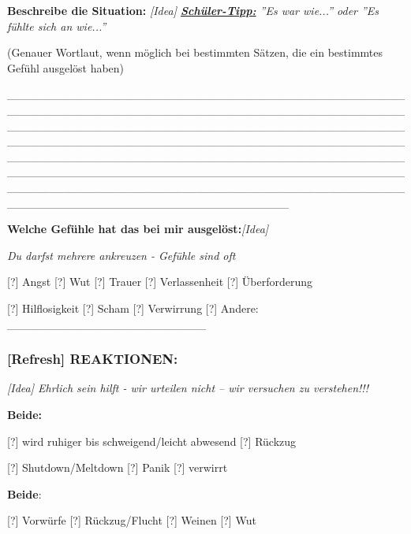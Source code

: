 \textbf{Beschreibe die Situation:} \emph{[Idea] \textbf{\ul{Schüler-Tipp:}} ''Es war wie...'' oder ''Es fühlte sich an wie...''}

(Genauer Wortlaut, wenn möglich bei bestimmten Sätzen, die ein bestimmtes Gefühl ausgelöst haben)

\_\_\_\_\_\_\_\_\_\_\_\_\_\_\_\_\_\_\_\_\_\_\_\_\_\_\_\_\_\_\_\_\_\_\_\_\_\_\_\_\_\_\_\_\_\_\_\_\_\_\_\_\_\_\_\_\_\_\_\_\_\_\_\_\_\_\_\_\_\_\_\_\_\_\_\_\_\_\_\_\_\_\_\_\_\_\_\_\_\_\_\_\_\_\_\_\_\_\_\_\_\_\_\_\_\_\_\_\_\_\_\_\_\_\_\_\_\_\_\_\_\_\_\_\_\_\_\_\_\_\_\_\_\_\_\_\_\_\_\_\_\_\_\_\_\_\_\_\_\_\_\_\_\_\_\_\_\_\_\_\_\_\_\_\_\_\_\_\_\_\_\_\_\_\_\_\_\_\_\_\_\_\_\_\_\_\_\_\_\_\_\_\_\_\_\_\_\_\_\_\_\_\_\_\_\_\_\_\_\_\_\_\_\_\_\_\_\_\_\_\_\_\_\_\_\_\_\_\_\_\_\_\_\_\_\_\_\_\_\_\_\_\_\_\_\_\_\_\_\_\_\_\_\_\_\_\_\_\_\_\_\_\_\_\_\_\_\_\_\_\_\_\_\_\_\_\_\_\_\_\_\_\_\_\_\_\_\_\_\_\_\_\_\_\_\_\_\_\_\_\_\_\_\_\_\_\_\_\_\_\_\_\_\_\_\_\_\_\_\_\_\_\_\_\_\_\_\_\_\_\_\_\_\_\_\_\_\_\_\_\_\_\_\_\_\_\_\_\_\_\_\_\_\_\_\_\_\_\_\_\_\_\_\_\_\_\_\_\_\_

\textbf{Welche Gefühle hat das bei mir ausgelöst:}\emph{[Idea]}

\emph{Du darfst mehrere ankreuzen - Gefühle sind oft}

[?] Angst [?] Wut [?] Trauer [?] Verlassenheit [?] Überforderung

[?] Hilflosigkeit [?] Scham [?] Verwirrung [?] Andere: \_\_\_\_\_\_\_\_\_\_\_\_\_\_\_\_\_\_\_\_\_\_\_\_

\hypertarget{section-3}{%
\subsubsection{}\label{section-3}}

\hypertarget{reaktionen}{%
\subsubsection{\texorpdfstring{\textbf{[Refresh] REAKTIONEN:}}{[Refresh] REAKTIONEN:}}\label{reaktionen}}

\emph{[Idea] Ehrlich sein hilft - wir urteilen nicht -- wir versuchen zu verstehen!!!}

\textbf{Beide:}

[?] wird ruhiger bis schweigend/leicht abwesend [?] Rückzug

[?] Shutdown/Meltdown [?] Panik [?] verwirrt

\textbf{Beide}:

[?] Vorwürfe [?] Rückzug/Flucht [?] Weinen [?] Wut

